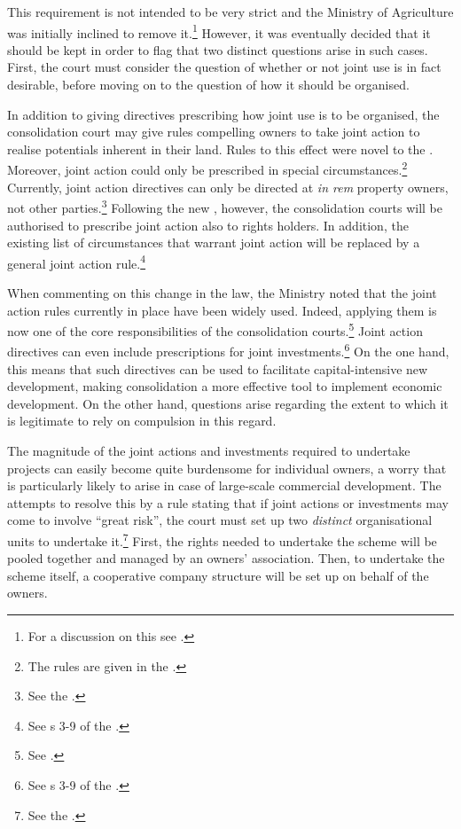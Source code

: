 This requirement is not intended to be very strict and the Ministry of Agriculture was initially inclined to remove it.\footnote{For a discussion on this see \cite[140-141]{prop12}.} However, it was eventually decided that it should be kept in order to flag that two distinct questions arise in such cases. First, the court must consider the question of whether or not joint use is in fact desirable, before moving on to the question of how it should be organised.

In addition to giving directives prescribing how joint use is to be organised, the consolidation court may give rules compelling owners to take joint action to realise potentials inherent in their land. Rules to this effect were novel to the \cite{lca79}. Moreover, joint action could only be prescribed in special circumstances.\footnote{The rules are given in the \cite[2 e)|42-44]{lca79}.} Currently, joint action directives can only be directed at {\it in rem} property owners, not other parties.\footnote{See the \cite[34 a)]{lca79}.} Following the new \cite{lca13}, however, the consolidation courts will be authorised to prescribe joint action also to rights holders. In addition, the existing list of circumstances that warrant joint action will be replaced by a general joint action rule.\footnote{See s 3-9 of the \cite{lca13}.}

When commenting on this change in the law, the Ministry noted that the joint action rules currently in place have been widely used. Indeed, applying them is now one of the core responsibilities of the consolidation courts.\footnote{See \cite[146]{prop12}.} Joint action directives can even include prescriptions for joint investments.\footnote{See s 3-9 of the \cite{lca13}.} On the one hand, this means that such directives can be used to facilitate capital-intensive new development, making consolidation a more effective tool to implement economic development. On the other hand, questions arise regarding the extent to which it is legitimate to rely on compulsion in this regard.

The magnitude of the joint actions and investments required to undertake projects can easily become quite burdensome for individual owners, a worry that is particularly likely to arise in case of large-scale commercial development. The \cite{lca79} attempts to resolve this by a rule stating that if joint actions or investments may come to involve ``great risk'', the court must set up two \emph{distinct} organisational units to undertake it.\footnote{See the \cite[34 b)|42]{lca79}.} First, the rights needed to undertake the scheme will be pooled together and managed by an owners' association. Then, to undertake the scheme itself, a cooperative company structure will be set up on behalf of the owners.

